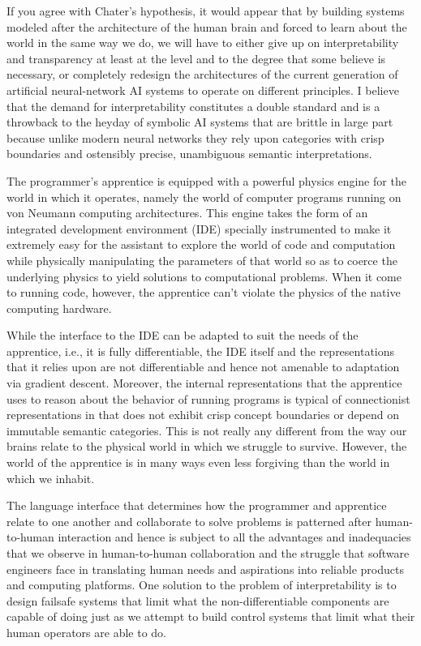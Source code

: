 If you agree with Chater's hypothesis, it would appear that by building systems modeled after the architecture of the human brain and forced to learn about the world in the same way we do, we will have to either give up on interpretability and transparency at least at the level and to the degree that some believe is necessary, or completely redesign the architectures of the current generation of artificial neural-network AI systems to operate on different principles. I believe that the demand for interpretability constitutes a double standard and is a throwback to the heyday of symbolic AI systems that are brittle in large part because unlike modern neural networks they rely upon categories with crisp boundaries and ostensibly precise, unambiguous semantic interpretations.

The programmer's apprentice is equipped with a powerful physics engine for the world in which it operates, namely the world of computer programs running on von Neumann computing architectures. This engine takes the form of an integrated development environment (IDE) specially instrumented to make it extremely easy for the assistant to explore the world of code and computation while physically manipulating the parameters of that world so as to coerce the underlying physics to yield solutions to computational problems. When it come to running code, however, the apprentice can't violate the physics of the native computing hardware.

While the interface to the IDE can be adapted to suit the needs of the apprentice, i.e., it is fully differentiable, the IDE itself and the representations that it relies upon are not differentiable and hence not amenable to adaptation via gradient descent. Moreover, the internal representations that the apprentice uses to reason about the behavior of running programs is typical of connectionist representations in that does not exhibit crisp concept boundaries or depend on immutable semantic categories. This is not really any different from the way our brains relate to the physical world in which we struggle to survive. However, the world of the apprentice is in many ways even less forgiving than the world in which we inhabit.

The language interface that determines how the programmer and apprentice relate to one another and collaborate to solve problems is patterned after human-to-human interaction and hence is subject to all the advantages and inadequacies that we observe in human-to-human collaboration and the struggle that software engineers face in translating human needs and aspirations into reliable products and computing platforms. One solution to the problem of interpretability is to design failsafe systems that limit what the non-differentiable components are capable of doing just as we attempt to build control systems that limit what their human operators are able to do.

